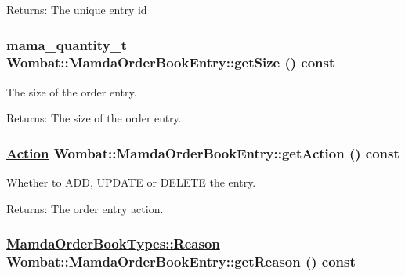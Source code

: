 \begin{Desc}
\item[Returns:]The unique entry id \end{Desc}
\hypertarget{classWombat_1_1MamdaOrderBookEntry_137d6488b4264e8b3f4509fe1f543aee}{
\subsubsection[getSize]{\setlength{\rightskip}{0pt plus 5cm}mama\_\-quantity\_\-t Wombat::Mamda\-Order\-Book\-Entry::get\-Size () const}}
\label{classWombat_1_1MamdaOrderBookEntry_137d6488b4264e8b3f4509fe1f543aee}


The size of the order entry. 

\begin{Desc}
\item[Returns:]The size of the order entry. \end{Desc}
\hypertarget{classWombat_1_1MamdaOrderBookEntry_ff550a6c85a7eab221361f352d7d9306}{
\subsubsection[getAction]{\setlength{\rightskip}{0pt plus 5cm}\hyperlink{classWombat_1_1MamdaOrderBookEntry_fc6cb1d67c7601d093a36f59cf9bcef4}{Action} Wombat::Mamda\-Order\-Book\-Entry::get\-Action () const}}
\label{classWombat_1_1MamdaOrderBookEntry_ff550a6c85a7eab221361f352d7d9306}


Whether to ADD, UPDATE or DELETE the entry. 

\begin{Desc}
\item[Returns:]The order entry action. \end{Desc}
\hypertarget{classWombat_1_1MamdaOrderBookEntry_0b9f3dbc9f5961c9776fa66f29c426bd}{
\subsubsection[getReason]{\setlength{\rightskip}{0pt plus 5cm}\hyperlink{classWombat_1_1MamdaOrderBookTypes_a1147c14315f68b9371c92a6a259fbd5}{Mamda\-Order\-Book\-Types::Reason} Wombat::Mamda\-Order\-Book\-Entry::get\-Reason () const}}
\label{classWombat_1_1MamdaOrderBookEntry_0b9f3dbc9f5961c9776fa66f29c426bd}


